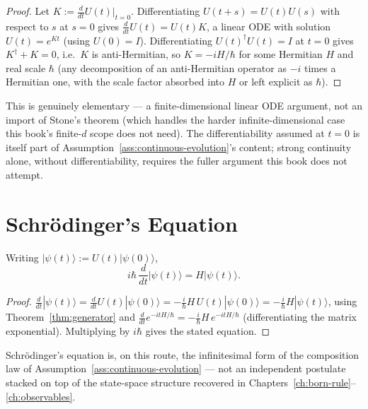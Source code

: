 \begin{proof}
Let $K := \frac{d}{dt}U(t)\big|_{t=0}$. Differentiating $U(t+s)=U(t)U(s)$
with respect to $s$ at $s=0$ gives $\frac{d}{dt}U(t) = U(t)K$, a linear ODE
with solution $U(t) = e^{Kt}$ (using $U(0)=I$). Differentiating
$U(t)^\dagger U(t) = I$ at $t=0$ gives $K^\dagger + K = 0$, i.e.\ $K$ is
anti-Hermitian, so $K = -iH/\hbar$ for some Hermitian $H$ and real scale
$\hbar$ (any decomposition of an anti-Hermitian operator as $-i$ times a
Hermitian one, with the scale factor absorbed into $H$ or left explicit as
$\hbar$).
\end{proof}

\begin{remark}
This is genuinely elementary — a finite-dimensional linear ODE argument, not
an import of Stone's theorem (which handles the harder infinite-dimensional
case this book's finite-$d$ scope does not need). The differentiability
assumed at $t=0$ is itself part of Assumption~\ref{ass:continuous-evolution}'s
content; strong continuity alone, without differentiability, requires the
fuller argument this book does not attempt.
\end{remark}

\section{Schr\"odinger's Equation}

\begin{corollary}
\label{cor:schrodinger}
Writing $|\psi(t)\rangle := U(t)|\psi(0)\rangle$,
\begin{equation}
i\hbar\,\frac{d}{dt}|\psi(t)\rangle = H|\psi(t)\rangle.
\end{equation}
\end{corollary}

\begin{proof}
$\frac{d}{dt}|\psi(t)\rangle = \frac{d}{dt}U(t)|\psi(0)\rangle = -\tfrac{i}{
\hbar}H\,U(t)|\psi(0)\rangle = -\tfrac{i}{\hbar}H|\psi(t)\rangle$, using
Theorem~\ref{thm:generator} and $\frac{d}{dt}e^{-itH/\hbar} = -\tfrac{i}{
\hbar}H\,e^{-itH/\hbar}$ (differentiating the matrix exponential). Multiplying
by $i\hbar$ gives the stated equation.
\end{proof}

\begin{remark}
Schr\"odinger's equation is, on this route, the infinitesimal form of the
composition law of Assumption~\ref{ass:continuous-evolution} — not an
independent postulate stacked on top of the state-space structure recovered
in Chapters~\ref{ch:born-rule}--\ref{ch:observables}.
\end{remark}

